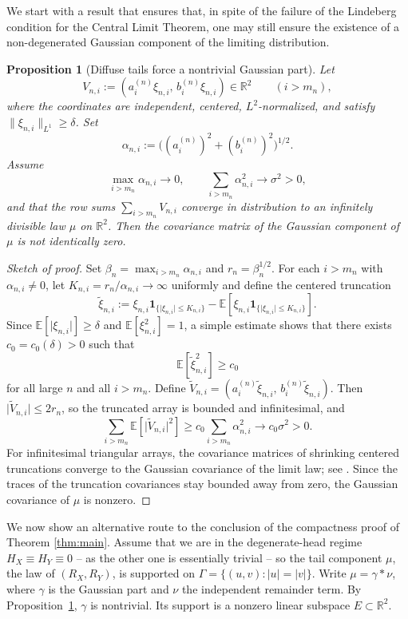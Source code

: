 \documentclass[11pt]{amsart}
\numberwithin{equation}{section}
\newtheorem{proposition}[theorem]{Proposition}
\theoremstyle{definition}
\theoremstyle{remark}
\newcommand{\E}{\mathbb E}
\newcommand{\R}{\mathbb R}
\newcommand{\abs}[1]{\lvert #1 \rvert}
\newcommand{\norm}[1]{\lVert #1 \rVert}
\begin{document}
We start with a result that ensures that, in spite of the failure of the Lindeberg condition for the Central Limit Theorem, one may still ensure the existence of a non-degenerated Gaussian component of the limiting distribution. 

\begin{proposition}[Diffuse tails force a nontrivial Gaussian part]
\label{prop:gaussian-part}
Let
\[
V_{n,i}:=(a_i^{(n)}\xi_{n,i},\,b_i^{(n)}\xi_{n,i})\in\R^2
\qquad(i>m_n),
\]
where the coordinates are independent, centered, $L^2$-normalized, and satisfy
$\norm{\xi_{n,i}}_{L^1}\ge \delta$.  Set
\[
\alpha_{n,i}:=\bigl((a_i^{(n)})^2+(b_i^{(n)})^2\bigr)^{1/2}.
\]
Assume
\[
\max_{i>m_n}\alpha_{n,i}\to0,
\qquad
\sum_{i>m_n}\alpha_{n,i}^2\to \sigma^2>0,
\]
and that the row sums $\sum_{i>m_n}V_{n,i}$ converge in distribution to an
infinitely divisible law $\mu$ on $\R^2$.  Then the covariance matrix of the Gaussian component of $\mu$ is not identically zero.
\end{proposition}

\begin{proof}[Sketch of proof]
Set $\beta_n=\max_{i>m_n}\alpha_{n,i}$ and $r_n=\beta_n^{1/2}$.  For each
$i>m_n$ with $\alpha_{n,i}\ne0$, let $K_{n,i}=r_n/\alpha_{n,i}\to\infty$
uniformly and define the centered truncation
\[
\widetilde\xi_{n,i}
:=
\xi_{n,i}\mathbf 1_{\{\abs{\xi_{n,i}}\le K_{n,i}\}}
-\E[\xi_{n,i}\mathbf 1_{\{\abs{\xi_{n,i}}\le K_{n,i}\}}].
\]
Since $\E[\abs{\xi_{n,i}}]\ge\delta$ and $\E[\xi_{n,i}^2]=1$, a simple estimate shows that there exists $c_0=c_0(\delta)>0$ such that
\[
\E[\widetilde\xi_{n,i}^2]\ge c_0
\]
for all large $n$ and all $i>m_n$.  Define
$\widetilde V_{n,i}=(a_i^{(n)}\widetilde\xi_{n,i},\,b_i^{(n)}\widetilde\xi_{n,i})$.
Then $\abs{\widetilde V_{n,i}}\le 2r_n$, so the truncated array is bounded and
infinitesimal, and
\[
\sum_{i>m_n}\E[\abs{\widetilde V_{n,i}}^2]
\ge c_0\sum_{i>m_n}\alpha_{n,i}^2
\longrightarrow c_0\sigma^2>0.
\]
For infinitesimal triangular arrays, the covariance matrices of shrinking
centered truncations converge to the Gaussian covariance of the limit law; see
\cite[Chapter~IV]{gnedenko-kolmogorov}.  Since the traces of the truncation
covariances stay bounded away from zero, the Gaussian covariance of $\mu$ is
nonzero.
\end{proof}

We now show an alternative route to the conclusion of the compactness proof of Theorem \ref{thm:main}. Assume that we are in the degenerate-head regime $H_X\equiv H_Y\equiv0$ -- as the other one is essentially trivial -- so the
tail component $\mu$, the law of $(R_X,R_Y)$, is supported on $\Gamma=\{(u,v):\abs{u}=\abs{v}\}$.
Write $\mu=\gamma*\nu$, where $\gamma$ is the Gaussian part and $\nu$ the
independent remainder term.  By Proposition~\ref{prop:gaussian-part}, $\gamma$ is
nontrivial.  Its support is a nonzero linear subspace $E\subset\R^2$.
\end{document}
